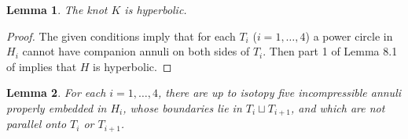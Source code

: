 \documentclass[12pt]{amsart}
\newtheorem{lema}{Lemma}
\begin{document}
\begin{lema} \label{hyperbolic}
The knot $K$ is hyperbolic. \end{lema}
\begin{proof}
The given conditions imply that for each $T_i$ ($i=1,\ldots, 4$) a power circle in $H_i$ cannot have companion annuli on both sides of $T_i$.
Then part 1 of Lemma 8.1 of \cite{Tejano} implies that $H$ is hyperbolic.
\end{proof}


\begin{lema}\label{5anillos}
For each $i=1,\ldots, 4$, there are up to isotopy five incompressible annuli properly embedded in $H_i$, whose boundaries lie in $T_i \sqcup T_{i+1}$, and which are not parallel onto $T_i$ or $T_{i+1}$. 
\end{lema}
\end{document}
